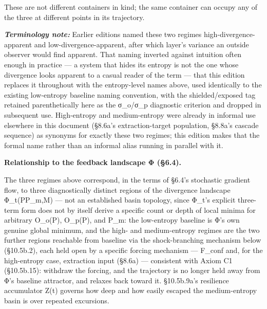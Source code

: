 \documentclass[
]{article}
\begin{document}
These are not different containers in kind; the same container can
occupy any of the three at different points in its trajectory.

\emph{\textbf{Terminology note:}} Earlier editions named these two
regimes high-divergence-apparent and low-divergence-apparent, after
which layer's variance an outside observer would find apparent. That
naming inverted against intuition often enough in practice --- a system
that hides its entropy is not the one whose divergence looks apparent to
a casual reader of the term --- that this edition replaces it throughout
with the entropy-level names above, used identically to the existing
low-entropy baseline naming convention, with the shielded/exposed tag
retained parenthetically here as the σ\_o/σ\_p diagnostic criterion and
dropped in subsequent use. High-entropy and medium-entropy were already
in informal use elsewhere in this document (§8.6a's extraction-target
population, §8.8a's cascade sequence) as synonyms for exactly these two
regimes; this edition makes that the formal name rather than an informal
alias running in parallel with it.

\textbf{Relationship to the feedback landscape Φ (§6.4).}

The three regimes above correspond, in the terms of §6.4's stochastic
gradient flow, to three diagnostically distinct regions of the
divergence landscape Φ\_t(PP\_m,M) --- not an established basin
topology, since Φ\_t's explicit three-term form does not by itself
derive a specific count or depth of local minima for arbitrary O\_o(P),
O\_p(P), and P\_m: the low-entropy baseline is Φ's own genuine global
minimum, and the high- and medium-entropy regimes are the two further
regions reachable from baseline via the shock-branching mechanism below
(§10.5b.2), each held open by a specific forcing mechanism --- F\_conf
and, for the high-entropy case, extraction input (§8.6a) --- consistent
with Axiom C1 (§10.5b.15): withdraw the forcing, and the trajectory is
no longer held away from Φ's baseline attractor, and relaxes back toward
it. §10.5b.9a's resilience accumulator Z(t) governs how deep and how
easily escaped the medium-entropy basin is over repeated excursions.
\end{document}
